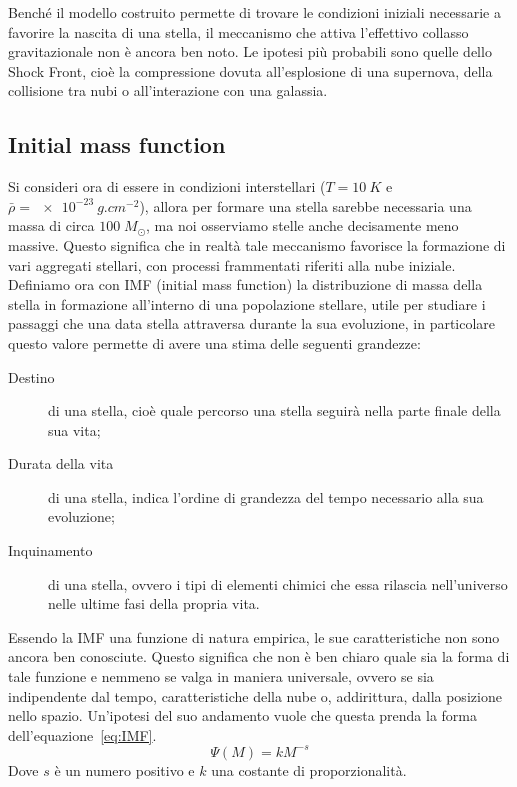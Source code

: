 Benché il modello costruito permette di trovare le condizioni iniziali necessarie a favorire la nascita di una stella, il meccanismo che attiva l'effettivo collasso gravitazionale non è ancora ben noto. Le ipotesi più probabili sono quelle dello Shock Front, cioè la compressione dovuta all'esplosione di una supernova, della collisione tra nubi o all'interazione con una galassia.
\subsection{Initial mass function}
Si consideri ora di essere in condizioni interstellari ($T = \SI{10}{K}$ e $ \bar \rho = \SI{e-23}{g.cm^{-2}} $), allora per formare una stella sarebbe necessaria una massa di circa $100 \;M_\odot $, ma noi osserviamo stelle anche decisamente meno massive. Questo significa che in realtà tale meccanismo favorisce la formazione di vari aggregati stellari, con processi frammentati riferiti alla nube iniziale. Definiamo ora con IMF (initial mass function) la distribuzione di massa della stella in formazione all'interno di una popolazione stellare, utile per studiare i passaggi che una data stella attraversa durante la sua evoluzione, in particolare questo valore permette di avere una stima delle seguenti grandezze:
\begin{description}
    \item[Destino] di una stella, cioè quale percorso una stella seguirà nella parte finale della sua vita;
    \item[Durata della vita] di una stella, indica l'ordine di grandezza del tempo necessario alla sua evoluzione;
    \item[Inquinamento] di una stella, ovvero i tipi di elementi chimici che essa rilascia nell'universo nelle ultime fasi della propria vita.
\end{description}

Essendo la IMF una funzione di natura empirica, le sue caratteristiche non sono ancora ben conosciute. Questo significa che non è ben chiaro quale sia la forma di tale funzione e nemmeno se valga in maniera universale, ovvero se sia indipendente dal tempo, caratteristiche della nube o, addirittura, dalla posizione nello spazio. Un'ipotesi del suo andamento vuole che questa prenda la forma dell'equazione~\ref{eq:IMF}.
\begin{equation}
    \Psi(M) = k M^{-s}
    \label{eq:IMF}
\end{equation}
Dove $s$ è un numero positivo e $k$ una costante di proporzionalità.

